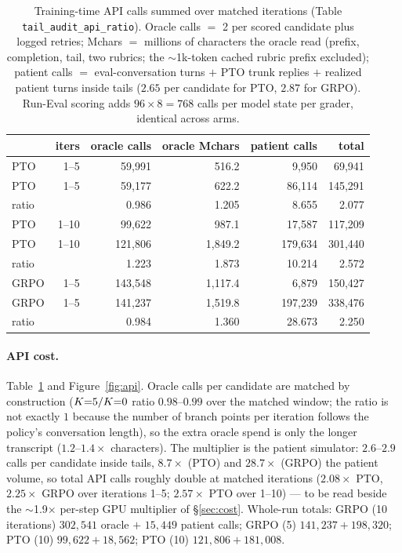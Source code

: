 \begin{table}[t]
  \centering\scriptsize
  \setlength{\tabcolsep}{2pt}
  \begin{tabular}{@{}lrrrrr@{}}
    \toprule
    & iters & oracle calls & oracle Mchars & patient calls & total \\
    \midrule
    PTO \Kz{}   & 1--5  & 59,991  & 516.2   & 9,950   & 69,941 \\
    PTO \Kf{}   & 1--5  & 59,177  & 622.2   & 86,114  & 145,291 \\
    \quad ratio &       & 0.986   & 1.205   & 8.655   & 2.077 \\
    PTO \Kz{}   & 1--10 & 99,622  & 987.1   & 17,587  & 117,209 \\
    PTO \Kf{}   & 1--10 & 121,806 & 1,849.2 & 179,634 & 301,440 \\
    \quad ratio &       & 1.223   & 1.873   & 10.214  & 2.572 \\
    GRPO \Kz{}  & 1--5  & 143,548 & 1,117.4 & 6,879   & 150,427 \\
    GRPO \Kf{}  & 1--5  & 141,237 & 1,519.8 & 197,239 & 338,476 \\
    \quad ratio &       & 0.984   & 1.360   & 28.673  & 2.250 \\
    \bottomrule
  \end{tabular}
  \caption{Training-time API calls summed over matched iterations (Table
    \texttt{tail\_audit\_api\_ratio}). Oracle calls $=$ 2 per scored candidate plus logged
    retries; Mchars $=$ millions of characters the oracle read (prefix, completion, tail,
    two rubrics; the $\sim$1k-token cached rubric prefix excluded); patient calls $=$
    eval-conversation turns $+$ PTO trunk replies $+$ realized patient turns inside tails
    ($2.65$ per candidate for PTO, $2.87$ for GRPO). Run-Eval scoring adds $96 \times 8 =
    768$ calls per model state per grader, identical across arms.}
  \label{tab:api}
\end{table}

\paragraph{API cost.} Table~\ref{tab:api} and Figure~\ref{fig:api}. Oracle calls per
candidate are matched by construction ($K{=}5{}/K{=}0{}$ ratio $0.98$--$0.99$ over the matched
window; the ratio is not exactly $1$ because the number of branch points per iteration
follows the policy's conversation length), so the extra oracle spend is only the longer
transcript ($1.2$--$1.4\times$ characters). The multiplier is the patient simulator: $2.6$--$2.9$
calls per candidate inside tails, $8.7\times$ (PTO) and $28.7\times$ (GRPO) the \Kz{} patient
volume, so total API calls roughly double at matched iterations ($2.08\times$ PTO,
$2.25\times$ GRPO over iterations 1--5; $2.57\times$ PTO over 1--10) --- to be read beside the
$\sim$1.9$\times$ per-step GPU multiplier of \S\ref{sec:cost}. Whole-run totals: GRPO \Kz{}
(10 iterations) $302{,}541$ oracle $+$ $15{,}449$ patient calls; GRPO \Kf{} (5) $141{,}237 +
198{,}320$; PTO \Kz{} (10) $99{,}622 + 18{,}562$; PTO \Kf{} (10) $121{,}806 + 181{,}008$.

